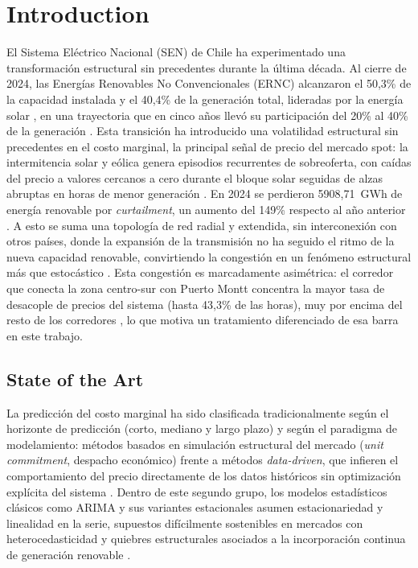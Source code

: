 \documentclass[applsci,article,submit,moreauthors,pdftex]{Definitions/mdpi}
\begin{document}
\section{Introduction}

El Sistema Eléctrico Nacional (SEN) de Chile ha experimentado una transformación estructural sin precedentes durante la última década. Al cierre de 2024, las Energías Renovables No Convencionales (ERNC) alcanzaron el 50,3\% de la capacidad instalada y el 40,4\% de la generación total, lideradas por la energía solar \cite{CEN2024}, en una trayectoria que en cinco años llevó su participación del 20\% al 40\% de la generación \cite{LaTercera}. Esta transición ha introducido una volatilidad estructural sin precedentes en el costo marginal, la principal señal de precio del mercado spot: la intermitencia solar y eólica genera episodios recurrentes de sobreoferta, con caídas del precio a valores cercanos a cero durante el bloque solar seguidas de alzas abruptas en horas de menor generación \cite{REVE}. En 2024 se perdieron 5908,71~GWh de energía renovable por \textit{curtailment}, un aumento del 149\% respecto al año anterior \cite{LaTerceraPerdidas}. A esto se suma una topología de red radial y extendida, sin interconexión con otros países, donde la expansión de la transmisión no ha seguido el ritmo de la nueva capacidad renovable, convirtiendo la congestión en un fenómeno estructural más que estocástico \cite{LeonSMPChile}. Esta congestión es marcadamente asimétrica: el corredor que conecta la zona centro-sur con Puerto Montt concentra la mayor tasa de desacople de precios del sistema (hasta 43,3\% de las horas), muy por encima del resto de los corredores \cite{LeonSMPChile}, lo que motiva un tratamiento diferenciado de esa barra en este trabajo.

\subsection{State of the Art}

La predicción del costo marginal ha sido clasificada tradicionalmente según el horizonte de predicción (corto, mediano y largo plazo) y según el paradigma de modelamiento: métodos basados en simulación estructural del mercado (\textit{unit commitment}, despacho económico) frente a métodos \textit{data-driven}, que infieren el comportamiento del precio directamente de los datos históricos sin optimización explícita del sistema \cite{weron}. Dentro de este segundo grupo, los modelos estadísticos clásicos como ARIMA y sus variantes estacionales asumen estacionariedad y linealidad en la serie, supuestos difícilmente sostenibles en mercados con heterocedasticidad y quiebres estructurales asociados a la incorporación continua de generación renovable \cite{weron}.
\end{document}
